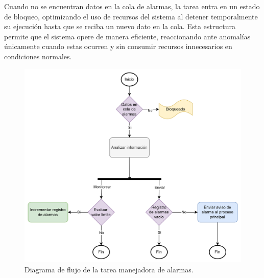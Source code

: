 Cuando no se encuentran datos en la cola de alarmas, la tarea entra en un estado de bloqueo, optimizando el uso de recursos del sistema al detener temporalmente su ejecución hasta que se reciba un nuevo dato en la cola. Esta estructura permite que el sistema opere de manera eficiente, reaccionando ante anomalías únicamente cuando estas ocurren y sin consumir recursos innecesarios en condiciones normales.

\newpage

\vspace{1cm}
\begin{figure}[htbp]
	\centering
	\includegraphics[width=1.0\textwidth, height=0.7\textheight]{./Figures/DdF_tarea_manejador_alarmas.png}
	\caption{Diagrama de flujo de la tarea manejadora de alarmas.}
	\label{fig:DdF_tarea_manejador_alarmas}
\end{figure}
\vspace{1cm}

\newpage
